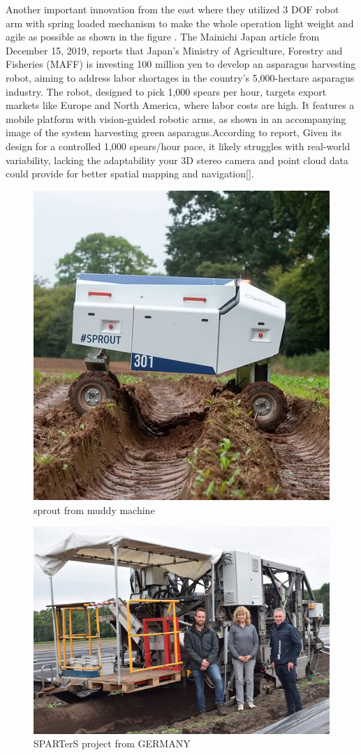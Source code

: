 Another important innovation from the east where they utilized 3 DOF robot arm with spring loaded mechanism to make the whole operation light weight and agile as possible as shown in the figure . The Mainichi Japan article from December 15, 2019, reports that Japan’s Ministry of Agriculture, Forestry and Fisheries (MAFF) is investing 100 million yen to develop an asparagus harvesting robot, aiming to address labor shortages in the country’s 5,000-hectare asparagus industry. The robot, designed to pick 1,000 spears per hour, targets export markets like Europe and North America, where labor costs are high. It features a mobile platform with vision-guided robotic arms, as shown in an accompanying image of the system harvesting green asparagus.According to report,  Given its design for a controlled 1,000 spears/hour pace, it likely struggles with real-world variability, lacking the adaptability your 3D stereo camera and point cloud data could provide for better spatial mapping and navigation[\cite{mainichi2019asparagus}].



\begin{figure}
    \centering
    \includegraphics[width=0.75\linewidth]{pictures/muddyMachine.png}
    \caption{sprout from muddy machine}
    \label{fig:enter-label}
\end{figure}
	

\begin{figure}
    \centering
    \includegraphics[width=0.75\linewidth]{pictures/spingel.png}
    \caption{SPARTerS project from GERMANY}
    \label{fig:enter-label}
\end{figure}


